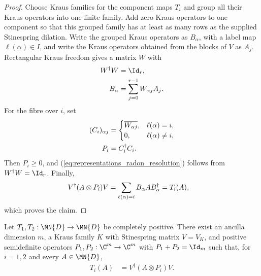 \begin{proof}\leanok
    Choose Kraus families for the component maps $T_i$ and group all their
    Kraus operators into one finite family. Add zero Kraus operators to one
    component so that this grouped family has at least as many rows as the
    supplied Stinespring dilation. Write the grouped Kraus operators as
    $B_\alpha$, with a label map $\ell(\alpha)\in I$, and write the Kraus
    operators obtained from the blocks of $V$ as $A_j$. Rectangular Kraus
    freedom gives a matrix $W$ with
    \begin{align}
        W^\dagger W
        &=\Id_r, \notag\\
        B_\alpha
        &=\sum_{j=0}^{r-1}W_{\alpha j}A_j.
        \notag
    \end{align}
    For the fibre over $i$, set
    \begin{align}
        (C_i)_{\alpha j}
        &=
        \begin{cases}
            \overline{W_{\alpha j}}, & \ell(\alpha)=i,\\
            0, & \ell(\alpha)\ne i,
        \end{cases}
        \notag\\
        P_i
        &=C_i^\dagger C_i.
        \label{eq:representations_radon_effects}
    \end{align}
    Then $P_i\ge0$, and (\ref{eq:representations_radon_resolution}) follows
    from $W^\dagger W=\Id_r$. Finally,
    \begin{align}
        V^\dagger(A\otimes P_i)V
        &=\sum_{\ell(\alpha)=i}B_\alpha A B_\alpha^\dagger
          =T_i(A),
        \notag
    \end{align}
    which proves the claim.
\end{proof}

\begin{theorem}
    \label{thm:cp_exists_radon_nikodym}
    \leanok
    Let $T_1,T_2:\MN{D}\to\MN{D}$ be completely positive. There exist
    an ancilla dimension $m$, a Kraus family $K$ with Stinespring matrix
    $V=V_K$, and positive semidefinite operators
    $P_1,P_2:\C^m\to\C^m$ with $P_1+P_2=\Id_m$ such that, for
    $i=1,2$ and every $A\in\MN{D}$,
    \begin{align}
        T_i(A)
        &=V^\dagger(A\otimes P_i)V.
        \label{eq:representations_binary_radon}
    \end{align}
\end{theorem}

